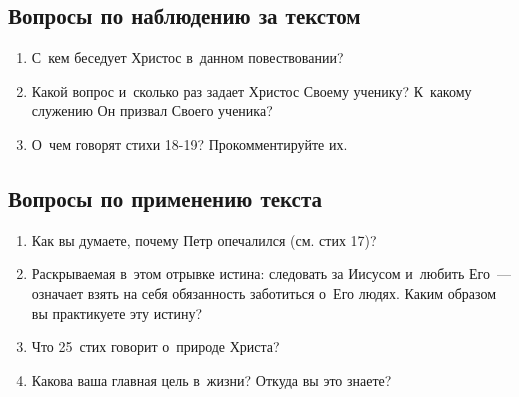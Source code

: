 \documentclass[a4paper,12pt]{article}
\begin{document}
\subsection*{Вопросы по наблюдению за текстом}
\begin{enumerate}
    \item С~кем беседует Христос в~данном повествовании? 
    
    \myline
    
    \myline
    \item Какой вопрос и~сколько раз задает Христос Своему ученику? К~какому служению Он призвал Своего ученика? 
    
    \myline
    
    \myline
    \item О~чем говорят стихи 18-19? Прокомментируйте их. 
    
    \myline
    
    \myline
\end{enumerate}

\subsection*{Вопросы по применению текста} 
\begin{enumerate}
    \item Как вы думаете, почему Петр опечалился (см. стих 17)?
    
    \myline
    
    \myline
    \item Раскрываемая в~этом отрывке истина: следовать за Иисусом и~любить Его~--- означает взять на себя обязанность заботиться о~Его людях. Каким образом вы практикуете эту истину? 
    
    \myline
    
    \myline
    \item Что 25~стих говорит о~природе Христа? 
    
    \myline
    
    \myline
    
    \item Какова ваша главная цель в~жизни? Откуда вы это знаете? 
    
    \myline
    
    \myline
\end{enumerate}
\end{document}
